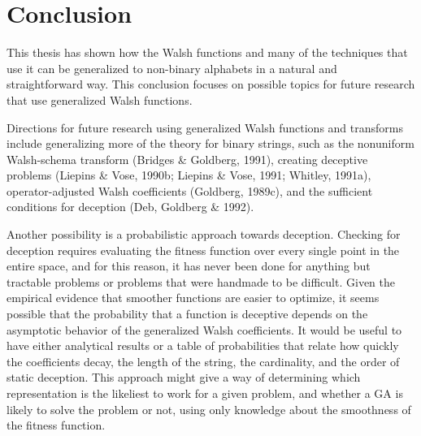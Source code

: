 \typeout{}

\chapter{Conclusion}
This thesis has shown how the Walsh functions and many of the techniques
that use it can be generalized to non-binary alphabets in a natural 
and straightforward way.  This conclusion focuses on possible topics
for future research that use generalized Walsh functions.

Directions for future research using generalized Walsh functions and
transforms include generalizing more of the theory for binary strings,
such as the nonuniform Walsh-schema transform
(Bridges \& Goldberg, 1991), creating deceptive problems
(Liepins \& Vose, 1990b; Liepins \& Vose, 1991; Whitley, 1991a),
operator-adjusted Walsh coefficients (Goldberg, 1989c),
and the sufficient conditions for deception (Deb, Goldberg \& 1992).

Another possibility is a probabilistic approach towards deception.
Checking for deception requires evaluating the fitness function over
every single point in the entire space, and for this reason, it has never
been done for anything but tractable problems or problems that were
handmade to be difficult.  Given the empirical evidence that smoother
functions are easier to optimize, it seems possible that the probability
that a function is deceptive depends on the asymptotic behavior
of the generalized Walsh coefficients.  It would be useful to have either
analytical results or a table of probabilities that relate how quickly
the coefficients decay, the length of the string, the cardinality,
and the order of static deception.  This approach might give a way
of determining which representation is the likeliest to work for a given
problem, and whether a GA is likely to solve the problem or not,
using only knowledge about the smoothness of the fitness function.

